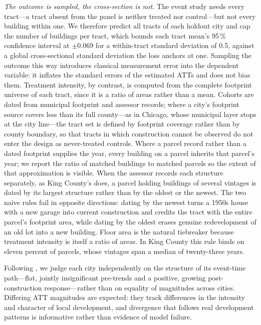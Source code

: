 \documentclass[conference]{IEEEtran}
\begin{document}
\emph{The outcome is sampled, the cross-section is not.} The event study needs
every tract---a tract absent from the panel is neither treated nor control---but
not every building within one. We therefore predict all tracts of each holdout
city and cap the number of buildings per tract, which bounds each tract mean's
95\,\% confidence interval at $\pm 0.069$ for a within-tract standard deviation of
0.5, against a global cross-sectional standard deviation the loss anchors at one.
Sampling the outcome this way introduces classical measurement error into the
dependent variable: it inflates the standard errors of the estimated ATTs and does
not bias them. Treatment intensity, by contrast, is computed from the complete
footprint universe of each tract, since it is a ratio of areas rather than a mean.
Cohorts are dated from municipal footprint and assessor records; where a city's
footprint source covers less than its full county---as in Chicago, whose municipal
layer stops at the city line---the tract set is defined by footprint coverage
rather than by county boundary, so that tracts in which construction cannot be
observed do not enter the design as never-treated controls. Where a parcel record
rather than a dated footprint supplies the year, every building on a parcel
inherits that parcel's year; we report the ratio of matched buildings to matched
parcels so the extent of that approximation is visible. When the assessor records
each structure separately, as King County's does, a parcel holding buildings of
several vintages is dated by its largest structure rather than by the oldest or
the newest. The two naive rules fail in opposite directions: dating by the newest
turns a 1950s house with a new garage into current construction and credits the
tract with the entire parcel's footprint area, while dating by the oldest erases
genuine redevelopment of an old lot into a new building. Floor area is the natural
tiebreaker because treatment intensity is itself a ratio of areas. In King County
this rule binds on eleven percent of parcels, whose vintages span a median of
twenty-three years.

Following \citet{csa}, we judge each city independently on the structure of its
event-time path---flat, jointly insignificant pre-trends and a positive, growing
post-construction response---rather than on equality of magnitudes across cities.
Differing ATT magnitudes are expected: they track differences in the intensity and
character of local development, and divergence that follows real development
patterns is informative rather than evidence of model failure.
\end{document}
